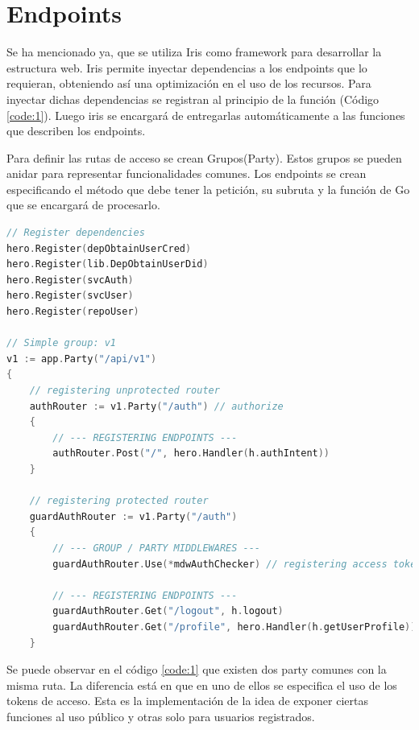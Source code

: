 \section{Endpoints}
Se ha mencionado ya, que se utiliza Iris como framework para desarrollar la estructura web. Iris permite inyectar dependencias a los endpoints que lo requieran, obteniendo así una optimización en el uso de los recursos. Para inyectar dichas dependencias se registran al principio de la función (Código \ref{code:1}). Luego iris se encargará de entregarlas automáticamente a las funciones que describen los endpoints.

Para definir las rutas de acceso se crean Grupos(Party). Estos grupos se pueden anidar para representar funcionalidades comunes. Los endpoints se crean especificando el método que debe tener la petición, su subruta y la función de Go que se encargará de procesarlo.

\begin{lstlisting}[language=Go,caption={Sistema de rutas de Iris}, label={code:1}]
// Register dependencies	
hero.Register(depObtainUserCred)
hero.Register(lib.DepObtainUserDid)
hero.Register(svcAuth)
hero.Register(svcUser)
hero.Register(repoUser)

// Simple group: v1
v1 := app.Party("/api/v1")
{
	// registering unprotected router
	authRouter := v1.Party("/auth") // authorize
	{
		// --- REGISTERING ENDPOINTS ---
		authRouter.Post("/", hero.Handler(h.authIntent))
	}
	
	// registering protected router
	guardAuthRouter := v1.Party("/auth")
	{
		// --- GROUP / PARTY MIDDLEWARES ---
		guardAuthRouter.Use(*mdwAuthChecker) // registering access token checker middleware
		
		// --- REGISTERING ENDPOINTS ---
		guardAuthRouter.Get("/logout", h.logout)
		guardAuthRouter.Get("/profile", hero.Handler(h.getUserProfile))
	}
\end{lstlisting}

Se puede observar en el código \ref{code:1} que existen dos party comunes con la misma ruta. La diferencia está en que en uno de ellos se especifica el uso de los tokens de acceso. Esta es la implementación de la idea de exponer ciertas funciones al uso público y otras solo para usuarios registrados.

